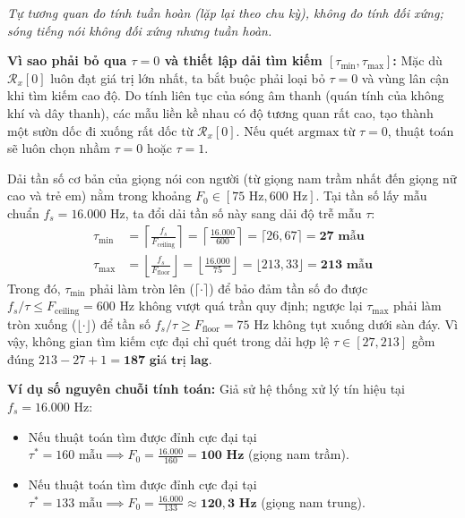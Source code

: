 \documentclass[11pt,a4paper]{article}
\begin{document}
\textit{Tự tương quan đo tính tuần hoàn (lặp lại theo chu kỳ), không đo tính đối xứng; sóng tiếng nói không đối xứng nhưng tuần hoàn.}

\textbf{Vì sao phải bỏ qua $\tau = 0$ và thiết lập dải tìm kiếm $[\tau_{\text{min}}, \tau_{\text{max}}]$:}
Mặc dù $\mathcal{R}_x[0]$ luôn đạt giá trị lớn nhất, ta bắt buộc phải loại bỏ $\tau = 0$ và vùng lân cận khi tìm kiếm cao độ. Do tính liên tục của sóng âm thanh (quán tính của không khí và dây thanh), các mẫu liền kề nhau có độ tương quan rất cao, tạo thành một sườn dốc đi xuống rất dốc từ $\mathcal{R}_x[0]$. Nếu quét $\text{argmax}$ từ $\tau = 0$, thuật toán sẽ luôn chọn nhầm $\tau = 0$ hoặc $\tau = 1$.

Dải tần số cơ bản của giọng nói con người (từ giọng nam trầm nhất đến giọng nữ cao và trẻ em) nằm trong khoảng $F_0 \in [75\text{ Hz}, 600\text{ Hz}]$. Tại tần số lấy mẫu chuẩn $f_s = 16.000\text{ Hz}$, ta đổi dải tần số này sang dải độ trễ mẫu $\tau$:
\begin{align}
\tau_{\text{min}} &= \left\lceil \frac{f_s}{F_{\text{ceiling}}} \right\rceil = \left\lceil \frac{16.000}{600} \right\rceil = \lceil 26{,}67 \rceil = \mathbf{27\text{ mẫu}} \label{eq:tau_min} \\
\tau_{\text{max}} &= \left\lfloor \frac{f_s}{F_{\text{floor}}} \right\rfloor = \left\lfloor \frac{16.000}{75} \right\rfloor = \lfloor 213{,}33 \rfloor = \mathbf{213\text{ mẫu}} \label{eq:tau_max}
\end{align}
Trong đó, $\tau_{\min}$ phải làm tròn lên ($\lceil \cdot \rceil$) để bảo đảm tần số đo được $f_s / \tau \le F_{\text{ceiling}} = 600\text{ Hz}$ không vượt quá trần quy định; ngược lại $\tau_{\max}$ phải làm tròn xuống ($\lfloor \cdot \rfloor$) để tần số $f_s / \tau \ge F_{\text{floor}} = 75\text{ Hz}$ không tụt xuống dưới sàn đáy. Vì vậy, không gian tìm kiếm cực đại chỉ quét trong dải hợp lệ $\tau \in [27, 213]$ gồm đúng $213 - 27 + 1 = \mathbf{187\text{ giá trị lag}}$.

\textbf{Ví dụ số nguyên chuỗi tính toán:}
Giả sử hệ thống xử lý tín hiệu tại $f_s = 16.000\text{ Hz}$:
\begin{itemize}
    \setlength{\itemsep}{0.5pt}
    \item Nếu thuật toán tìm được đỉnh cực đại tại $\tau^* = 160\text{ mẫu} \implies F_0 = \frac{16.000}{160} = \mathbf{100\text{ Hz}}$ (giọng nam trầm).
    \item Nếu thuật toán tìm được đỉnh cực đại tại $\tau^* = 133\text{ mẫu} \implies F_0 = \frac{16.000}{133} \approx \mathbf{120{,}3\text{ Hz}}$ (giọng nam trung).
\end{itemize}
\end{document}
